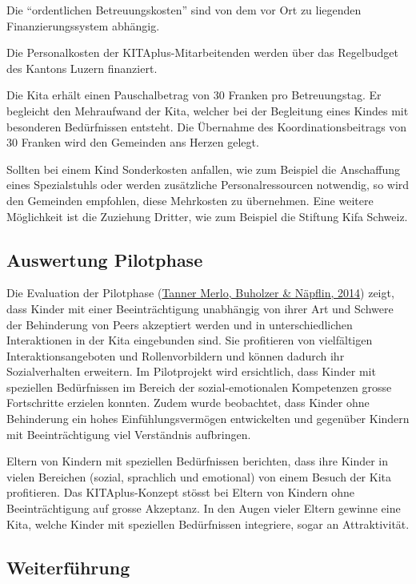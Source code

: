 \documentclass[
  ngerman,
  11pt,
  paper=a4,
  twoside,
  titlepage=true,
  openright,
  abstract=on,
  toc=listofnumbered,
  numbers=noenddot,
  chapterprefix=true,
  headings=optiontohead,
  svgnames,
  dvipsnames]{scrreprt}
\begin{document}
Die “ordentlichen Betreuungskosten” sind von dem vor Ort zu liegenden
Finanzierungssystem abhängig.

Die Personalkosten der KITAplus-Mitarbeitenden werden über das
Regelbudget des Kantons Luzern finanziert.

Die Kita erhält einen Pauschalbetrag von 30 Franken pro Betreuungstag.
Er begleicht den Mehraufwand der Kita, welcher bei der Begleitung eines
Kindes mit besonderen Bedürfnissen entsteht. Die Übernahme des
Koordinationsbeitrags von 30 Franken wird den Gemeinden ans Herzen
gelegt.

Sollten bei einem Kind Sonderkosten anfallen, wie zum Beispiel die
Anschaffung eines Spezialstuhls oder werden zusätzliche
Personalressourcen notwendig, so wird den Gemeinden empfohlen, diese
Mehrkosten zu übernehmen. Eine weitere Möglichkeit ist die Zuziehung
Dritter, wie zum Beispiel die Stiftung Kifa Schweiz.

\hypertarget{sec:pilotphase2017}{%
\subsection{Auswertung Pilotphase}\label{sec:pilotphase2017}}

Die Evaluation der Pilotphase
(\protect\hyperlink{ref-evalPilotphase}{Tanner Merlo, Buholzer \&
Näpflin, 2014}) zeigt, dass Kinder mit einer Beeinträchtigung unabhängig
von ihrer Art und Schwere der Behinderung von Peers akzeptiert werden
und in unterschiedlichen Interaktionen in der Kita eingebunden sind. Sie
profitieren von vielfältigen Interaktionsangeboten und Rollenvorbildern
und können dadurch ihr Sozialverhalten erweitern. Im Pilotprojekt wird
ersichtlich, dass Kinder mit speziellen Bedürfnissen im Bereich der
sozial-emotionalen Kompetenzen grosse Fortschritte erzielen konnten.
Zudem wurde beobachtet, dass Kinder ohne Behinderung ein hohes
Einfühlungsvermögen entwickelten und gegenüber Kindern mit
Beeinträchtigung viel Verständnis aufbringen.

Eltern von Kindern mit speziellen Bedürfnissen berichten, dass ihre
Kinder in vielen Bereichen (sozial, sprachlich und emotional) von einem
Besuch der Kita profitieren. Das KITAplus-Konzept stösst bei Eltern von
Kindern ohne Beeinträchtigung auf grosse Akzeptanz. In den Augen vieler
Eltern gewinne eine Kita, welche Kinder mit speziellen Bedürfnissen
integriere, sogar an Attraktivität.

\hypertarget{weiterfuxfchrung}{%
\subsection{Weiterführung}\label{weiterfuxfchrung}}
\end{document}
